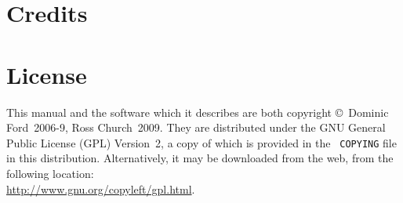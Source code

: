 \section{Credits}


\section{License}

This manual and the software which it describes are both copyright \copyright\
Dominic Ford~2006-9, Ross Church~2009. They are distributed under the GNU
General Public License (GPL) Version~2, a copy of which is provided in the {\tt
COPYING} file in this distribution. Alternatively, it may be downloaded from the web, from
the following location:\\ \url{http://www.gnu.org/copyleft/gpl.html}.


